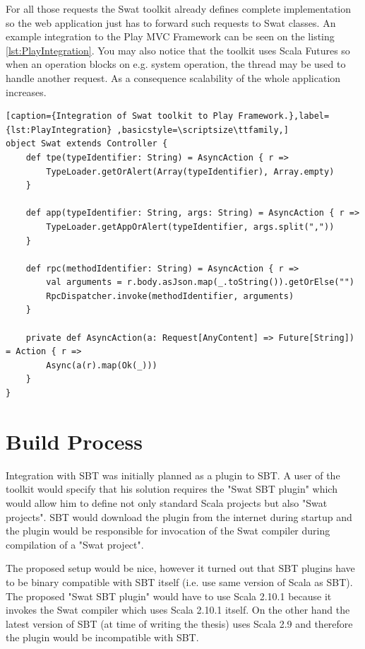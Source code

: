 \documentclass[12pt,a4paper]{report}
\begin{document}
For all those requests the Swat toolkit already defines complete implementation so the web application just has to forward such requests to Swat classes. An example integration to the Play MVC Framework\cite{Play} can be seen on the listing \ref{lst:PlayIntegration}. You may also notice that the toolkit uses Scala Futures\cite{ScalaFutures} so when an operation blocks on e.g. system operation, the thread may be used to handle another request. As a consequence scalability of the whole application increases.

\begin{lstlisting}[caption={Integration of Swat toolkit to Play Framework.},label={lst:PlayIntegration}	,basicstyle=\scriptsize\ttfamily,]
object Swat extends Controller {
    def tpe(typeIdentifier: String) = AsyncAction { r =>
        TypeLoader.getOrAlert(Array(typeIdentifier), Array.empty)
    }

    def app(typeIdentifier: String, args: String) = AsyncAction { r =>
        TypeLoader.getAppOrAlert(typeIdentifier, args.split(","))
    }

    def rpc(methodIdentifier: String) = AsyncAction { r =>
        val arguments = r.body.asJson.map(_.toString()).getOrElse("")
        RpcDispatcher.invoke(methodIdentifier, arguments)
    }

    private def AsyncAction(a: Request[AnyContent] => Future[String]) = Action { r =>
        Async(a(r).map(Ok(_)))
    }
}
\end{lstlisting}

\section{Build Process}

Integration with SBT was initially planned as a plugin to SBT. A user of the toolkit would specify that his solution requires the "Swat SBT plugin" which would allow him to define not only standard Scala projects but also "Swat projects". SBT would download the plugin from the internet during startup and the plugin would be responsible for invocation of the Swat compiler during compilation of a "Swat project". 

The proposed setup would be nice, however it turned out that SBT plugins have to be binary compatible with SBT itself (i.e. use same version of Scala as SBT). The proposed "Swat SBT plugin" would have to use Scala 2.10.1 because it invokes the Swat compiler which uses Scala 2.10.1 itself. On the other hand the latest version of SBT (at time of writing the thesis) uses Scala 2.9 and therefore the plugin would be incompatible with SBT.
\end{document}
